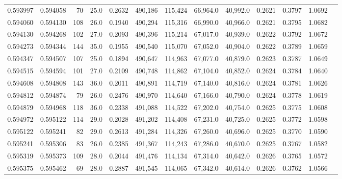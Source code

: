 \begin{tabular}{rrrrrrrrrrrrr}
0.593997 & 0.594058 &    70 & 25.0 &                                     0.2632 & 490,186 & 115,424 &  66,964.0 &  40,992.0 & 0.2621 & 0.3797 & 1.0692 \\
0.594060 & 0.594130 &   108 & 26.0 &                                     0.1940 & 490,294 & 115,316 &  66,990.0 &  40,966.0 & 0.2621 & 0.3795 & 1.0682 \\
0.594130 & 0.594268 &   102 & 27.0 &                                     0.2093 & 490,396 & 115,214 &  67,017.0 &  40,939.0 & 0.2622 & 0.3792 & 1.0672 \\
0.594273 & 0.594344 &   144 & 35.0 &                                     0.1955 & 490,540 & 115,070 &  67,052.0 &  40,904.0 & 0.2622 & 0.3789 & 1.0659 \\
0.594347 & 0.594507 &   107 & 25.0 &                                     0.1894 & 490,647 & 114,963 &  67,077.0 &  40,879.0 & 0.2623 & 0.3787 & 1.0649 \\
0.594515 & 0.594594 &   101 & 27.0 &                                     0.2109 & 490,748 & 114,862 &  67,104.0 &  40,852.0 & 0.2624 & 0.3784 & 1.0640 \\
0.594608 & 0.594808 &   143 & 36.0 &                                     0.2011 & 490,891 & 114,719 &  67,140.0 &  40,816.0 & 0.2624 & 0.3781 & 1.0626 \\
0.594812 & 0.594874 &    79 & 26.0 &                                     0.2476 & 490,970 & 114,640 &  67,166.0 &  40,790.0 & 0.2624 & 0.3778 & 1.0619 \\
0.594879 & 0.594968 &   118 & 36.0 &                                     0.2338 & 491,088 & 114,522 &  67,202.0 &  40,754.0 & 0.2625 & 0.3775 & 1.0608 \\
0.594972 & 0.595122 &   114 & 29.0 &                                     0.2028 & 491,202 & 114,408 &  67,231.0 &  40,725.0 & 0.2625 & 0.3772 & 1.0598 \\
0.595122 & 0.595241 &    82 & 29.0 &                                     0.2613 & 491,284 & 114,326 &  67,260.0 &  40,696.0 & 0.2625 & 0.3770 & 1.0590 \\
0.595241 & 0.595306 &    83 & 26.0 &                                     0.2385 & 491,367 & 114,243 &  67,286.0 &  40,670.0 & 0.2625 & 0.3767 & 1.0582 \\
0.595319 & 0.595373 &   109 & 28.0 &                                     0.2044 & 491,476 & 114,134 &  67,314.0 &  40,642.0 & 0.2626 & 0.3765 & 1.0572 \\
0.595375 & 0.595462 &    69 & 28.0 &                                     0.2887 & 491,545 & 114,065 &  67,342.0 &  40,614.0 & 0.2626 & 0.3762 & 1.0566 \\

\end{tabular}
